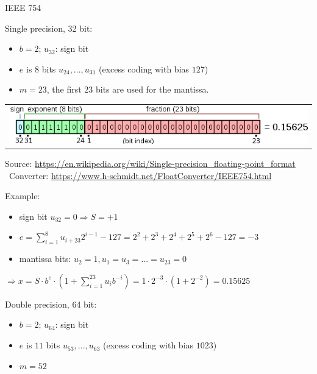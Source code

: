 \documentclass[11pt,compress,t,notes=noshow, xcolor=table]{beamer}
\begin{document}
\begin{vbframe}{IEEE 754}

Single precision, 32 bit:
\begin{itemize}
  \item $b = 2$; $u_{32}$: sign bit
  \item $e$ is $8$ bits $u_{24}, ..., u_{31}$ (excess coding with bias $127$)
  \item $m = 23$, the first 23 bits are used for the mantissa.
\end{itemize}

\begin{center}
\begin{tabular}{l}
  \includegraphics{figure_man/32bit_new} \\[0.15cm]
\end{tabular}
{\scriptsize
Source: \url{https://en.wikipedia.org/wiki/Single-precision_floating-point_format}\\\
Converter: \url{https://www.h-schmidt.net/FloatConverter/IEEE754.html}
}
\end{center}

Example:
\begin{itemize}
  \item sign bit $u_{32} = 0 \Rightarrow S = +1$
  \item $e = \sum_{i=1}^{8} u_{i+23} 2^{i-1} - 127 = 2^2 + 2^3+ 2^4+ 2^5 + 2^6 - 127 = -3$
  \item mantissa bits: $u_2 = 1, u_1=u_3=...=u_{23}=0$
\end{itemize}


$\Rightarrow x = S \cdot b^e \cdot (1 + \sum_{i=1}^{23} u_{i} b^{-i}) = 1 \cdot 2^{-3} \cdot (1 + 2^{-2}) = 0.15625$

\framebreak

Double precision, 64 bit:
\begin{itemize}
  \item $b = 2$; $u_{64}$: sign bit
  \item $e$ is $11$ bits $u_{53}, ..., u_{63}$ (excess coding with bias $1023$)
  \item $m = 52$
\end{itemize}



\end{vbframe}
\end{document}
